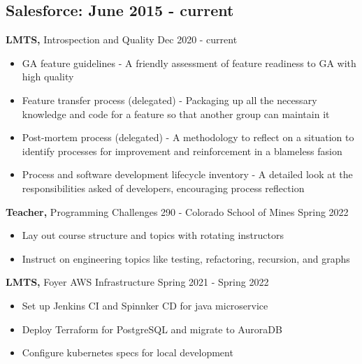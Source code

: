 \documentclass[12pt]{res}
\begin{document}

\address{{\bf Contact Information} \\ (720) 219-7914 \\ gik0geck0@gmail.com}
\address{{\bf Open Source} \\ https://github.com/gik0geck0 }

\begin{resume}

\section{Salesforce: June 2015 - current}

{\bf LMTS,} Introspection and Quality \hfill Dec 2020 - current
\begin{itemize} \itemsep -2pt
    \item GA feature guidelines - A friendly assessment of feature readiness to GA with high quality
    \item Feature transfer process (delegated) - Packaging up all the necessary knowledge and code for a feature so that another group can maintain it
    \item Post-mortem process (delegated) - A methodology to reflect on a situation to identify processes for improvement and reinforcement in a blameless fasion
    \item Process and software development lifecycle inventory - A detailed look at the responsibilities asked of developers, encouraging process reflection
\end{itemize}

{\bf Teacher,} Programming Challenges 290 - Colorado School of Mines \hfill Spring 2022
\begin{itemize} \itemsep -2pt
    \item Lay out course structure and topics with rotating instructors
    \item Instruct on engineering topics like testing, refactoring, recursion, and graphs
\end{itemize}

{\bf LMTS,} Foyer AWS Infrastructure \hfill Spring 2021 - Spring 2022
\begin{itemize} \itemsep -2pt
    \item Set up Jenkins CI and Spinnker CD for java microservice
    \item Deploy Terraform for PostgreSQL and migrate to AuroraDB
    \item Configure kubernetes specs for local development
\end{itemize}


\end{resume}
\end{document}
